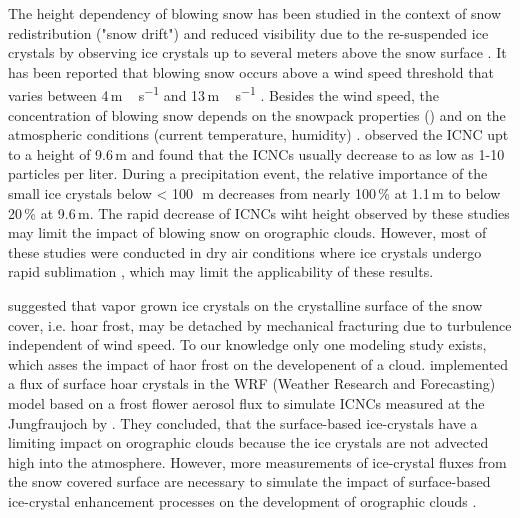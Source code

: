 \documentclass[draft,linenumbers]{agujournal}
\begin{document}
{The height dependency of blowing snow has been studied in the context of snow redistribution ("snow drift") and reduced visibility due to the re-suspended ice crystals by observing ice crystals up to several meters above the snow surface \citet{Sch82, Nis05}. It has been reported that blowing snow occurs above a wind speed threshold that varies between 4\,\si{m\,s^{-1}} and 13\,\si{m\,s^{-1}} \citep{Bro88, Li97, Mah03, Der99}. Besides the wind speed, the concentration of blowing snow depends on the snowpack properties () and on the atmospheric conditions (current temperature, humidity) \citep{Vio13}. \citet{Nis05} observed the ICNC upt to a height of 9.6\,\si{m} and found that the ICNCs usually decrease to as low as 1-10 particles per liter. During a precipitation event, the relative importance of the small ice crystals below < 100\,\si{\mu m} decreases from nearly 100\,\si{\%} at 1.1\,\si{m} to below 20\,\si{\%} at 9.6\,\si{m}. The rapid decrease of ICNCs wiht height observed by these studies may limit the impact of blowing snow on orographic clouds. However, most of these studies were conducted in dry air conditions where ice crystals undergo rapid sublimation \citep{Yan08}, which may limit the applicability of these results.
 
\citet{Loy15} suggested that vapor grown ice crystals on the crystalline surface of the snow cover, i.e. hoar frost, may be detached by mechanical fracturing due to turbulence independent of wind speed. To our knowledge only one modeling study exists, which asses the impact of haor frost on the developenent of a cloud. \citet{Far15} implemented a flux of surface hoar crystals in the WRF (Weather Research and Forecasting) model based on a frost flower aerosol flux to simulate ICNCs measured at the Jungfraujoch by \citet{Llo15}. They concluded, that the surface-based ice-crystals have a limiting impact on orographic clouds because the ice crystals are not advected high into the atmosphere. However, more measurements of ice-crystal fluxes from the snow covered surface are necessary to simulate the impact of surface-based ice-crystal enhancement processes on the development of orographic clouds \citep{Far15}.

}
\end{document}

